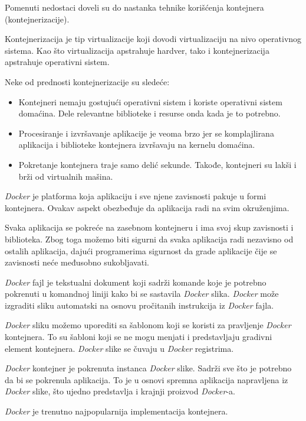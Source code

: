 Pomenuti nedostaci doveli su do nastanka tehnike korišćenja kontejnera (kontejnerizacije). 

Kontejnerizacija je tip virtualizacije koji dovodi virtualizaciju na nivo operativnog 
sistema. Kao što virtualizacija apstrahuje hardver, tako i kontejnerizacija apstrahuje 
operativni sistem.

Neke od prednosti kontejnerizacije su sledeće:
\begin{itemize}
    \item Kontejneri nemaju gostujući operativni sistem i koriste operativni sistem domaćina. 
    Dele relevantne biblioteke i resurse onda kada je to potrebno.
    \item Procesiranje i izvršavanje aplikacije je veoma brzo jer se komplajlirana aplikacija 
    i biblioteke kontejnera izvršavaju na kernelu domaćina.
    \item Pokretanje kontejnera traje samo delić sekunde. Takođe, kontejneri su lakši i brži 
    od virtualnih mašina.
\end{itemize}

\textit{Docker} je platforma koja aplikaciju i sve njene zavisnosti pakuje u formi kontejnera. 
Ovakav aspekt obezbeđuje da aplikacija radi na svim okruženjima.

Svaka aplikacija se pokreće na zasebnom kontejneru i ima svoj skup zavisnosti i biblioteka. 
Zbog toga možemo biti sigurni da svaka aplikacija radi nezavisno od ostalih aplikacija, 
dajući programerima sigurnost da grade aplikacije čije se zavisnosti neće međusobno sukobljavati.

\textit{Docker} fajl je tekstualni dokument koji sadrži komande koje je potrebno pokrenuti 
u komandnoj liniji kako bi se sastavila \textit{Docker} slika. \textit{Docker} može izgraditi sliku automatski 
na osnovu pročitanih instrukcija iz \textit{Docker} fajla.

\textit{Docker} sliku možemo uporediti sa šablonom koji se koristi za pravljenje \textit{Docker} kontejnera. 
To su šabloni koji se ne mogu menjati i predstavljaju gradivni element kontejnera.
\textit{Docker} slike se čuvaju u \textit{Docker} registrima. 

\textit{Docker} kontejner je pokrenuta instanca \textit{Docker} slike. Sadrži sve što je potrebno da bi se 
pokrenula aplikacija. To je u osnovi spremna aplikacija napravljena iz \textit{Docker} slike, 
što ujedno predstavlja i krajnji proizvod \textit{Docker}-a.~\cite{docker}

\textit{Docker} je trenutno najpopularnija implementacija kontejnera.

